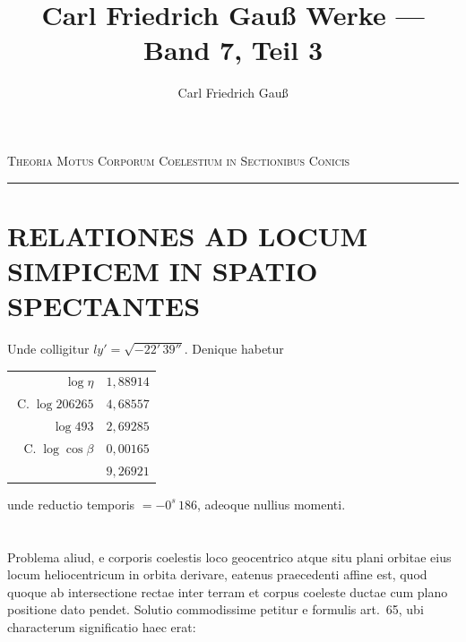 \documentclass[12pt,a4paper]{article}
\title{Carl Friedrich Gauß Werke --- Band 7, Teil 3}
\author{Carl Friedrich Gauß}
\date{}
\newcommand{\C}{\mathop{\mathrm{C.}}\nolimits}
\begin{document}
\maketitle
\thispagestyle{empty}

\begin{center}
\Large\scshape Theoria Motus Corporum Coelestium in Sectionibus Conicis
\end{center}

\vspace{1em}
\noindent\rule{\textwidth}{0.4pt}
\vspace{1em}

\setcounter{section}{73}

\section*{RELATIONES AD LOCUM SIMPICEM IN SPATIO SPECTANTES}

\vspace{-1em}
\noindent Unde colligitur $ly' = \surd{-22'\,39''}$. Denique habetur
\begin{center}
\begin{tabular}{@{}r@{\quad}l@{}}
$\log \eta$ & $1{,}88914$ \raisebox{0.5ex}{$n$} \\
$\C \log 206265$ & $4{,}68557$ \\
$\log 493$ & $2{,}69285$ \\
$\C \log \cos \beta$ & $0{,}00165$ \\ \hline
& $9{,}26921$ \raisebox{0.5ex}{$n$}
\end{tabular}
\end{center}
unde reductio temporis $= -0^s\,186$, adeoque nullius momenti.

\sectionmark{}
\section{}
Problema aliud, e corporis coelestis loco geocentrico atque situ plani orbitae
eius locum heliocentricum in orbita derivare, eatenus praecedenti affine est, quod
quoque ab intersectione rectae inter terram et corpus coeleste ductae cum
plano positione dato pendet. Solutio commodissime petitur e formulis art.~65,
ubi characterum significatio haec erat:
\end{document}
